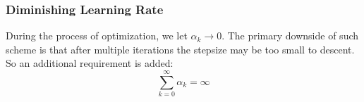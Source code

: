 \subsubsection{Diminishing Learning Rate}
During the process of optimization, we let $ \alpha_k\rightarrow 0 $.
The primary downside of such scheme is that after multiple iterations
the stepsize may be too small to descent. So an additional requirement
is added:
\begin{equation}
    \sum\limits_{k=0}^\infty\alpha_k = \infty
\end{equation}
